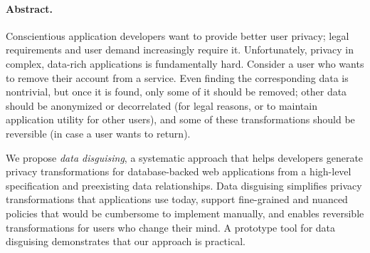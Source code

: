 \paragraph{Abstract.}

Conscientious application developers want to provide better user privacy;
legal requirements and user demand increasingly require it.
%
Unfortunately, privacy in complex, data-rich applications is fundamentally
hard. Consider a user who wants to remove their account from a service. Even
finding the corresponding data is nontrivial, but once it is found, only some
of it should be removed; other data should be anonymized or decorrelated (for
legal reasons, or to maintain application utility for other users), and some
of these transformations should be reversible (in case a user wants to
return).
%
%
%

We propose \emph{data disguising}, a systematic approach that helps developers generate
privacy transformations for database-backed web applications from a high-level specification
and preexisting data relationships.
%
Data disguising simplifies privacy transformations that applications use today, support
fine-grained and nuanced policies that would be cumbersome to implement manually, and
enables reversible transformations for users who change their mind.
%
%
A prototype tool for data disguising demonstrates that our approach is practical.

